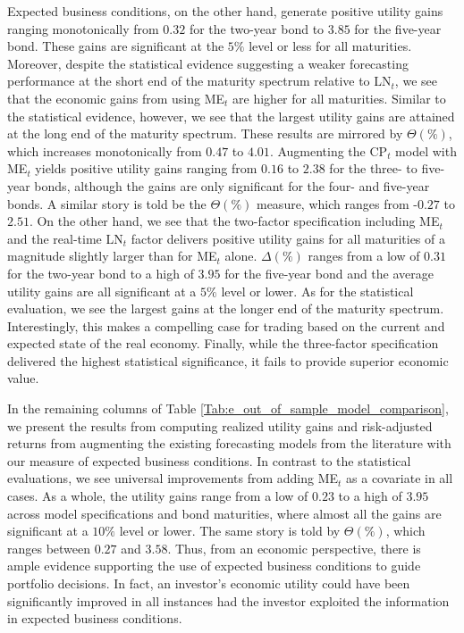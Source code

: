 \documentclass[12pt,letterpaper,leqno,doublespacing]{article}
\begin{document}
Expected business conditions, on the other hand, generate positive utility gains ranging monotonically from $0.32$ for the two-year bond to $3.85$ for the five-year bond. These gains are significant at the $5\%$ level or less for all maturities. Moreover, despite the statistical evidence suggesting a weaker forecasting performance at the short end of the maturity spectrum relative to LN$_{t}$, we see that the economic gains from using ME$_{t}$ are higher for all maturities. Similar to the statistical evidence, however, we see that the largest utility gains are attained at the long end of the maturity spectrum. These results are mirrored by $\Theta\left(\%\right)$, which increases monotonically from $0.47$ to $4.01$. Augmenting the CP$_{t}$ model with ME$_{t}$ yields positive utility gains ranging from $0.16$ to $2.38$ for the three- to five-year bonds, although the gains are only significant for the four- and five-year bonds. A similar story is told be the $\Theta\left(\%\right)$ measure, which ranges from -$0.27$ to $2.51$. On the other hand, we see that the two-factor specification including ME$_{t}$ and the real-time LN$_{t}$ factor delivers positive utility gains for all maturities of a magnitude slightly larger than for ME$_{t}$ alone. $\Delta\left(\%\right)$ ranges from a low of $0.31$ for the two-year bond to a high of $3.95$ for the five-year bond and the average utility gains are all significant at a $5\%$ level or lower. As for the statistical evaluation, we see the largest gains at the longer end of the maturity spectrum. Interestingly, this makes a compelling case for trading based on the current and expected state of the real economy. Finally, while the three-factor specification delivered the highest statistical significance, it fails to provide superior economic value. 

In the remaining columns of Table \ref{Tab:e_out_of_sample_model_comparison}, we present the results from computing realized utility gains and risk-adjusted returns from augmenting the existing forecasting models from the literature with our measure of expected business conditions. In contrast to the statistical evaluations, we see universal improvements from adding ME$_{t}$ as a covariate in all cases. As a whole, the utility gains range from a low of $0.23$ to a high of $3.95$ across model specifications and bond maturities, where almost all the gains are significant at a $10\%$ level or lower. The same story is told by $\Theta\left(\%\right)$, which ranges between $0.27$ and $3.58$. Thus, from an economic perspective, there is ample evidence supporting the use of expected business conditions to guide portfolio decisions. In fact, an investor's economic utility could have been significantly improved in all instances had the investor exploited the information in expected business conditions.
\end{document}
